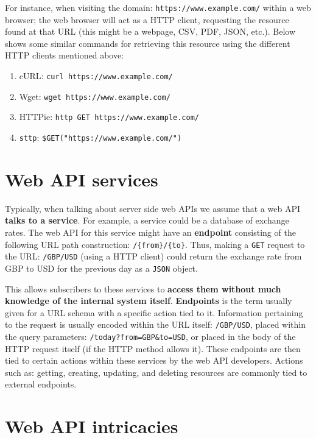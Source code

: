 For instance, when visiting the domain: \verb|https://www.example.com/| within a web browser; the web browser will act as a HTTP client, requesting the resource found at that URL (this might be a webpage, CSV, PDF, JSON, etc.). Below shows some similar commands for retrieving this resource using the different HTTP clients mentioned above:

\begin{enumerate}
    \item cURL: \texttt{curl https://www.example.com/}
    \item Wget: \texttt{wget https://www.example.com/}
    \item HTTPie: \texttt{http GET https://www.example.com/}
    \item \verb|sttp|: \verb|$GET("https://www.example.com/")|
\end{enumerate}

\section{Web API services}

Typically, when talking about server side web APIs we assume that a web API \textbf{talks to a service}. For example, a service could be a database of exchange rates. The web API for this service might have an \textbf{endpoint} consisting of the following URL path construction: \verb|/{from}/{to}|. Thus, making a \verb|GET| request to the URL: \verb|/GBP/USD| (using a HTTP client) could return the exchange rate from GBP to USD for the previous day as a \verb|JSON| object.

This allows subscribers to these services to \textbf{access them without much knowledge of the internal system itself}. \textbf{Endpoints} is the term usually given for a URL schema with a specific action tied to it. Information pertaining to the request is usually encoded within the URL itself: \verb|/GBP/USD|, placed within the query parameters: \verb|/today?from=GBP&to=USD|, or placed in the body of the HTTP request itself (if the HTTP method allows it). These endpoints are then tied to certain actions within these services by the web API developers. Actions such as: getting, creating, updating, and deleting resources are commonly tied to external endpoints.

\section{Web API intricacies}

